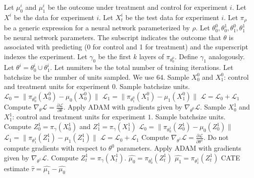 \begin{algorithm}[H]
\caption{Frozen Features T-learner}
\label{alg:frozen-t}
\begin{algorithmic}[1]
\STATE Let $\mu^{i}_0$ and $\mu^{i}_1$ be the outcome under treatment and control for experiment $i$. 
\STATE Let $X^i$ be the data for experiment $i$. Let $X^i_t$ be the test data for experiment $i$. 
\STATE Let $\pi_\rho$ be a generic expression for a neural network parameterized by $\rho$. 
\STATE Let $\theta_0^0, \theta_0^1, \theta_1^0, \theta_1^1$ be neural network parameters. The subscript indicates the outcome that $\theta$ is associated with predicting (0 for control and 1 for treatment) and the superscript indexes the experiment.
\STATE Let $\gamma_0$ be the first $k$ layers of $\pi_{\theta^0_0}$. Define $\gamma_1$ analogously. 
\STATE Let $\theta^i = \theta^i_0 \cup \theta^i_1$. 
\STATE Let numiters be the total number of training iterations.
\STATE Let batchsize be the number of units sampled. We use 64. 
\STATE Sample $X^0_0$ and $X^0_1$: control and treatment units for experiment $0$. Sample batchsize units.  
\STATE $\mathcal{L}_0= \| \pi_{\theta^0_0} (X^0_0) - \mu_0(X^0_0) \| $
\STATE $\mathcal{L}_1 = \| \pi_{\theta^0_1} (X^0_1) - \mu_1(X^0_1) \| $
\STATE $\mathcal{L} = \mathcal{L}_0 + \mathcal{L}_1$
\STATE Compute $\nabla_{\theta} \mathcal{L} = \frac{\partial \mathcal{L}}{\partial \theta}$.
\STATE Apply ADAM with gradients given by $\nabla_{\theta^0} \mathcal{L}$. 
\ENDFOR
{}
\STATE Sample $X^1_0$ and $X^1_1$: control and treatment units for experiment $1$. Sample batchsize units. 
\STATE Compute $Z^1_0 = \pi_\gamma(X^1_0)$ and $Z^1_1 = \pi_\gamma(X^1_1)$
\STATE $\mathcal{L}_0= \| \pi_{\theta_0^1} (Z^1_0) - \mu_0(Z^1_0) \| $
\STATE $\mathcal{L}_1 = \| \pi_{\theta_1^1} (Z^1_1) - \mu_1(Z^1_1) \| $
\STATE $\mathcal{L} = \mathcal{L}_0 + \mathcal{L}_1$
\STATE Compute $\nabla_{\theta^1} \mathcal{L} = \frac{\partial \mathcal{L}}{\partial \theta^1}$. Do not compute gradients with respect to $\theta^0$ parameters. 
\STATE Apply ADAM with gradients given by $\nabla_{\theta^1} \mathcal{L}$. 
\ENDFOR
\STATE Compute $Z^1_t = \pi_\gamma(X^1_t)$. 
\STATE $\hat{\mu_0} = \pi_{\theta^1_0} (Z^1_t)$
\STATE $\hat{\mu_1} = \pi_{\theta^1_1} (Z^1_t)$
 CATE estimate $\hat{\tau} = \hat{\mu_1} - \hat{\mu_0}$
\end{algorithmic}
\end{algorithm}

